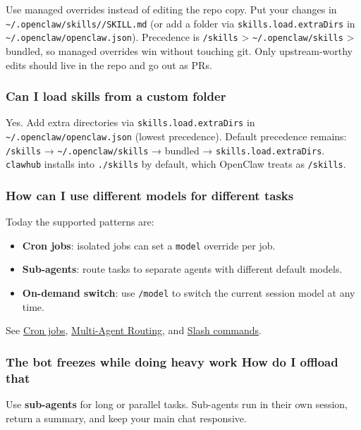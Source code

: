 Use managed overrides instead of editing the repo copy. Put your changes in \texttt{\textasciitilde{}/.openclaw/skills//SKILL.md} (or add a folder via \texttt{skills.load.extraDirs} in \texttt{\textasciitilde{}/.openclaw/openclaw.json}). Precedence is \texttt{/skills} > \texttt{\textasciitilde{}/.openclaw/skills} > bundled, so managed overrides win without touching git. Only upstream-worthy edits should live in the repo and go out as PRs.

\subsubsection{Can I load skills from a custom folder}


Yes. Add extra directories via \texttt{skills.load.extraDirs} in \texttt{\textasciitilde{}/.openclaw/openclaw.json} (lowest precedence). Default precedence remains: \texttt{/skills} → \texttt{\textasciitilde{}/.openclaw/skills} → bundled → \texttt{skills.load.extraDirs}. \texttt{clawhub} installs into \texttt{./skills} by default, which OpenClaw treats as \texttt{/skills}.

\subsubsection{How can I use different models for different tasks}


Today the supported patterns are:

\begin{itemize}
  \item \textbf{Cron jobs}: isolated jobs can set a \texttt{model} override per job.
  \item \textbf{Sub-agents}: route tasks to separate agents with different default models.
  \item \textbf{On-demand switch}: use \texttt{/model} to switch the current session model at any time.
\end{itemize}


See \href{/automation/cron-jobs}{Cron jobs}, \href{/concepts/multi-agent}{Multi-Agent Routing}, and \href{/tools/slash-commands}{Slash commands}.

\subsubsection{The bot freezes while doing heavy work How do I offload that}


Use \textbf{sub-agents} for long or parallel tasks. Sub-agents run in their own session,
return a summary, and keep your main chat responsive.

